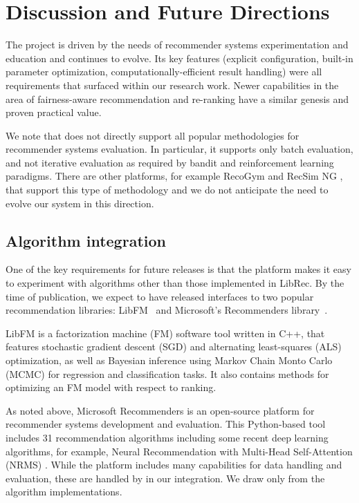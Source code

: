 \section{Discussion and Future Directions}
The \libauto{} project is driven by the needs of recommender systems experimentation and education and continues to evolve. Its key features (explicit configuration, built-in parameter optimization, computationally-efficient result handling) were all requirements that surfaced within our research work. Newer capabilities in the area of fairness-aware recommendation and re-ranking have a similar genesis and proven practical value. 

We note that \libauto{} does not directly support all popular methodologies for recommender systems evaluation. In particular, it supports only batch evaluation, and not iterative evaluation as required by bandit and reinforcement learning paradigms. There are other platforms, for example RecoGym \cite{rohde2018recogym} and RecSim NG \cite{mladenov2021recsim}, that support this type of methodology and we do not anticipate the need to evolve our system in this direction. 

\subsection{Algorithm integration}
One of the key requirements for future releases is that the platform makes it easy to experiment with algorithms other than those implemented in LibRec. By the time of publication, we expect to have released interfaces to two popular recommendation libraries:  LibFM~\cite{rendle2012factorization} and Microsoft's Recommenders library~\cite{argyriou2020microsoft}. 

LibFM\cite{rendle2012factorization} is a factorization machine (FM) software tool written in C++, that features stochastic gradient descent (SGD) and alternating least-squares (ALS) optimization, as well as Bayesian inference using Markov Chain Monto Carlo (MCMC) for regression and classification tasks. It also contains methods for optimizing an FM model with respect to ranking. 


As noted above, Microsoft Recommenders \cite{MicrosoftRecommenders} is an open-source platform for recommender systems development and evaluation. This Python-based tool includes 31 recommendation algorithms including some recent deep learning algorithms, for example, Neural Recommendation with Multi-Head Self-Attention (NRMS) \cite{wu2019neural}. While the platform includes many capabilities for data handling and evaluation, these are handled by \libauto{} in our integration. We draw only from the algorithm implementations. 

